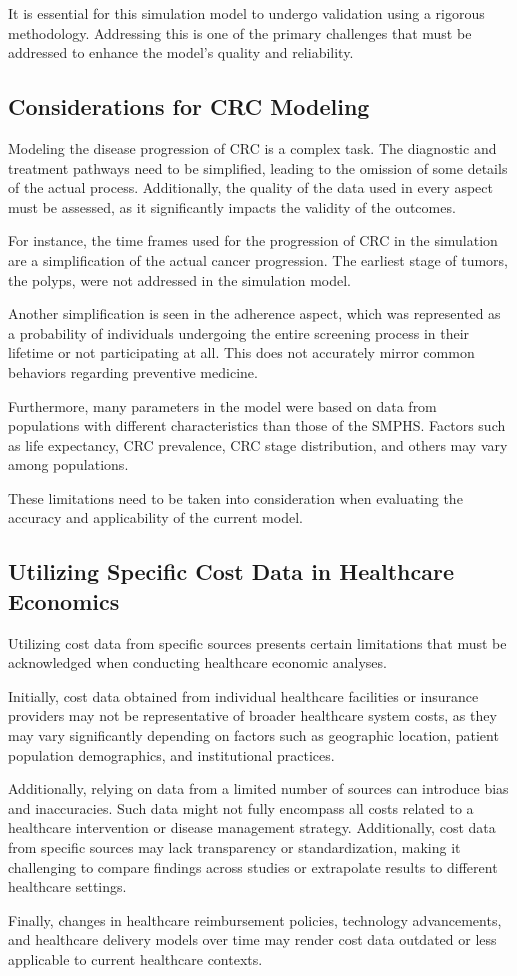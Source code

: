 It is essential for this simulation model to undergo validation using a rigorous methodology. Addressing this is one of the primary challenges that must be addressed to enhance the model's quality and reliability.

\subsection*{Considerations for CRC Modeling}

Modeling the disease progression of CRC is a complex task. The diagnostic and treatment pathways need to be simplified, leading to the omission of some details of the actual process. Additionally, the quality of the data used in every aspect must be assessed, as it significantly impacts the validity of the outcomes.

For instance, the time frames used for the progression of CRC in the simulation are a simplification of the actual cancer progression. The earliest stage of tumors, the polyps, were not addressed in the simulation model.

Another simplification is seen in the adherence aspect, which was represented as a probability of individuals undergoing the entire screening process in their lifetime or not participating at all. This does not accurately mirror common behaviors regarding preventive medicine.

Furthermore, many parameters in the model were based on data from populations with different characteristics than those of the SMPHS. Factors such as life expectancy, CRC prevalence, CRC stage distribution, and others may vary among populations.

These limitations need to be taken into consideration when evaluating the accuracy and applicability of the current model.

\subsection*{Utilizing Specific Cost Data in Healthcare Economics}

Utilizing cost data from specific sources presents certain limitations that must be acknowledged when conducting healthcare economic analyses. 

Initially, cost data obtained from individual healthcare facilities or insurance providers may not be representative of broader healthcare system costs, as they may vary significantly depending on factors such as geographic location, patient population demographics, and institutional practices. 

Additionally, relying on data from a limited number of sources can introduce bias and inaccuracies. Such data might not fully encompass all costs related to a healthcare intervention or disease management strategy. Additionally, cost data from specific sources may lack transparency or standardization, making it challenging to compare findings across studies or extrapolate results to different healthcare settings. 

Finally, changes in healthcare reimbursement policies, technology advancements, and healthcare delivery models over time may render cost data outdated or less applicable to current healthcare contexts.
